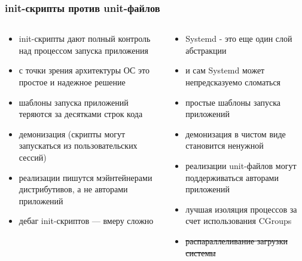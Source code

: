 \documentclass[aspectratio=169]{beamer}
\begin{document}
\begin{frame}
  \frametitle{init-скрипты против unit-файлов}

  \begin{columns}
    \begin{column}{.5\textwidth}
      \begin{itemize}
        \item init-скрипты дают полный контроль над процессом запуска приложения
        \item с точки зрения архитектуры ОС это простое и надежное решение
        \item шаблоны запуска приложений теряются за десятками строк кода
        \item демонизация (скрипты могут запускаться из пользовательских сессий)
        \item реализации пишутся мэйнтейнерами дистрибутивов, а не авторами приложений
        \item дебаг init-скриптов --- вмеру сложно
      \end{itemize}
    \end{column}

    \begin{column}{.5\textwidth}
      \begin{itemize}
        \item Systemd - это еще один слой абстракции
        \item и сам Systemd может непредсказуемо сломаться
        \item простые шаблоны запуска приложений
        \item демонизация в чистом виде становится ненужной
        \item реализации unit-файлов могут поддерживаться авторами приложений
        \item лучшая изоляция процессов за счет использования CGroups
        \item \sout{распараллеливание загрузки системы}
      \end{itemize}
    \end{column}
  \end{columns}

\end{frame}
\end{document}
